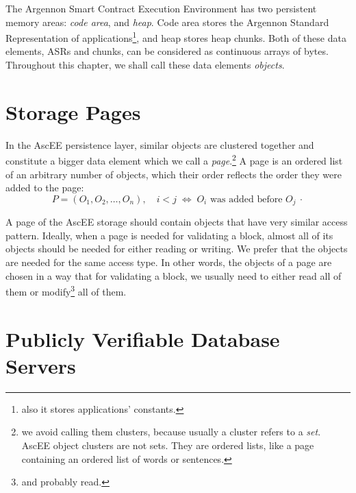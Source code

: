 
The Argennon Smart Contract Execution Environment has two persistent memory areas: \emph{code area}, and \emph{heap}.
Code area stores the Argennon Standard Representation of
applications\footnote{also it stores applications' constants.}, and heap stores heap chunks.
Both of these data elements, ASRs and chunks, can be considered as continuous arrays of bytes.
Throughout this chapter, we shall call these data elements \emph{objects}.


\section{Storage Pages}\label{sec:storage-pages}

In the AscEE persistence layer, similar objects are clustered together and constitute a bigger data element which we
call
a \emph{page}.\footnote{we avoid calling them clusters, because usually a cluster refers to a \emph{set}. AscEE object
clusters are not sets. They are ordered lists, like a page containing an ordered list of words or sentences.}
A page is an ordered list of an arbitrary number of objects, which their order reflects the order they were added to
the page:
\[
    P = (O_1,O_2,\dots,O_n),\quad i < j \; \Leftrightarrow \; \textrm{$O_i$ was added before $O_j$}\ \cdot
\]

A page of the AscEE storage should contain objects that have very similar access pattern. Ideally, when a page is needed
for validating a block, almost all of its objects should be needed for either reading or writing. We prefer
that the objects are needed for the same access type. In other words, the objects of a page are chosen in a way that
for validating a block, we usually need to either read all of them or modify\footnote{and probably read.} all of them.


\section{Publicly Verifiable Database Servers}\label{sec:zk-edb}

